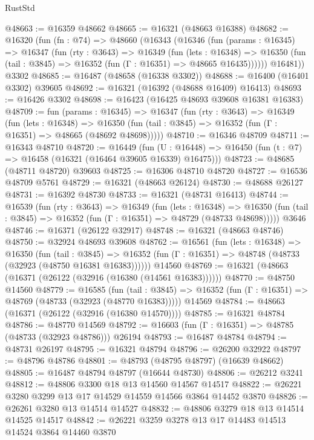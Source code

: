 \begin{lexlean}{RustStd}
\begin{coremodule}
@48663 := @16359 @48662
@48665 := @16321 (@48663 @16388)
@48682 := @16320
    (fun (fn : @74) =>
    @48660
      (@16343
        (@16346
          (fun (params : @16345) =>
          @16347
            (fun (rty : @3643) =>
            @16349
              (fun (lets : @16348) =>
              @16350 (fun (tail : @3845) => @16352 (fun (Γ : @16351) => @48665 @16435))))))
        @16481))
    @3302
@48685 := @16487 (@48658 (@16338 @3302))
@48688 := @16400 (@16401 @3302) @39605
@48692 := @16321 (@16392 (@48688 @16409) @16413)
@48693 := @16426 @3302
@48698 := @16423 (@16425 @48693 @39608 @16381 @16383)
@48709 := fun (params : @16345) =>
  @16347
    (fun (rty : @3643) =>
    @16349
      (fun (lets : @16348) =>
      @16350 (fun (tail : @3845) => @16352 (fun (Γ : @16351) => @48665 (@48692 @48698)))))
@48710 := @16346 @48709
@48711 := @16343 @48710
@48720 := @16449
    (fun (U : @16448) => @16450 (fun (t : @7) => @16458 (@16321 (@16464 @39605 @16339) @16475)))
@48723 := @48685 (@48711 @48720) @39603
@48725 := @16306 @48710 @48720
@48727 := @16536 @48709 @5761
@48729 := @16321 (@48663 @26124)
@48730 := @48688 @26127
@48731 := @16392 @48730
@48733 := @16321 (@48731 @16413)
@48744 := @16539
    (fun (rty : @3643) =>
    @16349
      (fun (lets : @16348) =>
      @16350 (fun (tail : @3845) => @16352 (fun (Γ : @16351) => @48729 (@48733 @48698)))))
    @3646
@48746 := @16371 (@26122 @32917)
@48748 := @16321 (@48663 @48746)
@48750 := @32924 @48693 @39608
@48762 := @16561
    (fun (lets : @16348) =>
    @16350
      (fun (tail : @3845) =>
      @16352 (fun (Γ : @16351) => @48748 (@48733 (@32923 (@48750 @16381 @16383))))))
    @14560
@48769 := @16321 (@48663 (@16371 (@26122 (@32916 (@16380 (@14561 @16383))))))
@48770 := @48750 @14560
@48779 := @16585
    (fun (tail : @3845) => @16352 (fun (Γ : @16351) => @48769 (@48733 (@32923 (@48770 @16383)))))
    @14569
@48784 := @48663 (@16371 (@26122 (@32916 (@16380 @14570))))
@48785 := @16321 @48784
@48786 := @48770 @14569
@48792 := @16603 (fun (Γ : @16351) => @48785 (@48733 (@32923 @48786))) @26194
@48793 := @16487 @48784
@48794 := @48731 @26197
@48795 := @16321 @48794
@48796 := @26200 @32922
@48797 := @48796 @48786
@48801 := @48793 (@48795 @48797) (@16639 @48662)
@48805 := @16487 @48794 @48797 (@16644 @48730)
@48806 := @26212 @3241
@48812 := @48806 @3300 @18 @13 @14560 @14567 @14517
@48822 := @26221 @3280 @3299 @13 @17 @14529 @14559 @14566 @3864 @14452 @3870
@48826 := @26261 @3280 @13 @14514 @14527
@48832 := @48806 @3279 @18 @13 @14514 @14525 @14517
@48842 := @26221 @3259 @3278 @13 @17 @14483 @14513 @14524 @3864 @14460 @3870

\end{coremodule}
\end{lexlean}

